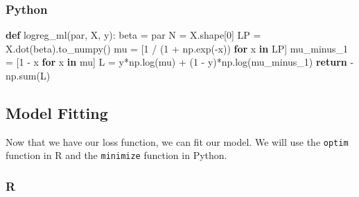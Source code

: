 \documentclass[
  letterpaper,
]{krantz}
\newenvironment{Shaded}{}{}
\newcommand{\BuiltInTok}[1]{\textcolor[rgb]{0.00,0.50,0.00}{#1}}
\newcommand{\ControlFlowTok}[1]{\textcolor[rgb]{0.00,0.44,0.13}{\textbf{#1}}}
\newcommand{\DecValTok}[1]{\textcolor[rgb]{0.25,0.63,0.44}{#1}}
\newcommand{\KeywordTok}[1]{\textcolor[rgb]{0.00,0.44,0.13}{\textbf{#1}}}
\newcommand{\NormalTok}[1]{#1}
\newcommand{\OperatorTok}[1]{\textcolor[rgb]{0.40,0.40,0.40}{#1}}
\begin{document}
\subsubsection{Python}

\begin{Shaded}
\begin{Highlighting}[]
\KeywordTok{def}\NormalTok{ logreg\_ml(par, X, y):}
\NormalTok{    beta }\OperatorTok{=}\NormalTok{ par}
\NormalTok{    N }\OperatorTok{=}\NormalTok{ X.shape[}\DecValTok{0}\NormalTok{]}
\NormalTok{    LP }\OperatorTok{=}\NormalTok{ X.dot(beta).to\_numpy()  }
\NormalTok{    mu }\OperatorTok{=}\NormalTok{ [}\DecValTok{1} \OperatorTok{/}\NormalTok{ (}\DecValTok{1} \OperatorTok{+}\NormalTok{ np.exp(}\OperatorTok{{-}}\NormalTok{x)) }\ControlFlowTok{for}\NormalTok{ x }\KeywordTok{in}\NormalTok{ LP]}
\NormalTok{    mu\_minus\_1 }\OperatorTok{=}\NormalTok{ [}\DecValTok{1} \OperatorTok{{-}}\NormalTok{ x }\ControlFlowTok{for}\NormalTok{ x }\KeywordTok{in}\NormalTok{ mu]}
\NormalTok{    L }\OperatorTok{=}\NormalTok{ y}\OperatorTok{*}\NormalTok{np.log(mu) }\OperatorTok{+}\NormalTok{ (}\DecValTok{1} \OperatorTok{{-}}\NormalTok{ y)}\OperatorTok{*}\NormalTok{np.log(mu\_minus\_1)   }
    \ControlFlowTok{return} \OperatorTok{{-}}\NormalTok{np.}\BuiltInTok{sum}\NormalTok{(L)   }
  
\end{Highlighting}
\end{Shaded}

\subsection{Model Fitting}\label{model-fitting}

Now that we have our loss function, we can fit our model. We will use
the \texttt{optim} function in R and the \texttt{minimize} function in
Python.

\subsubsection{R}
\end{document}
